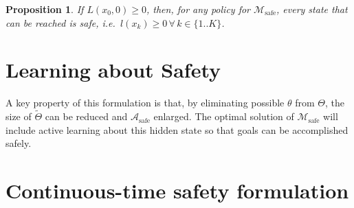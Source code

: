 \documentclass{article}
\newtheorem{prop}{Proposition}
\newcommand{\aspace}{\ensuremath{\mathcal{A}} }
\newcommand{\dstate}{\theta}
\newcommand{\dsspace}{\Theta}
\begin{document}
\begin{prop}
    If $L(x_0, 0)\geq 0$, then, for any policy for $\mathcal{M}_\text{safe}$, every state that can be reached is safe, i.e.\ $l(x_k) \geq 0 \, \forall\, k \in \{1..K\}$.
    \label{prop:safe}
\end{prop}


\section{Learning about Safety}

A key property of this formulation is that, by eliminating possible $\dstate$ from $\dsspace$, the size of $\tilde{\dsspace}$ can be reduced and $\aspace_\text{safe}$ enlarged.
The optimal solution of $\mathcal{M}_\text{safe}$ will include active learning about this hidden state so that goals can be accomplished safely.

%     

% 

\section{Continuous-time safety formulation}


% 
\end{document}
